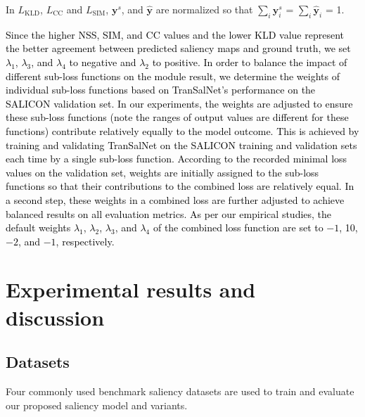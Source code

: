 \documentclass{article}
\begin{document}
In $L_{\text{KLD}}$, $L_{\text{CC}}$ and $L_{\text{SIM}}$, $\textbf{y}^s$, and $\hat{\textbf{y}}$ are normalized so that $\sum_{i} \textbf{y}^s_i$ = $\sum_{i} \hat{\textbf{y}}_i$ = 1.

\textcolor{black}{Since the higher NSS, SIM, and CC values and the lower KLD value represent the better agreement between predicted saliency maps and ground truth, we set ${{\lambda}_1}$, ${{\lambda}_3}$, and ${{\lambda}_4}$ to negative and ${{\lambda}_2}$ to positive. In order to balance the impact of different sub-loss functions on the module result, we determine the weights of individual sub-loss functions based on TranSalNet's performance on the SALICON validation set. In our experiments, the weights are adjusted to ensure these sub-loss functions (note the ranges of output values are different for these functions) contribute relatively equally to the model outcome. This is achieved by training and validating TranSalNet on the SALICON training and validation sets each time by a single sub-loss function. According to the recorded minimal loss values on the validation set, weights are initially assigned to the sub-loss functions so that their contributions to the combined loss are relatively equal. 
In a second step, these weights in a combined loss are further adjusted to achieve balanced results on all evaluation metrics.
As per our empirical studies, the default weights ${{\lambda}_1}$, ${{\lambda}_2}$, ${{\lambda}_3}$, and ${{\lambda}_4}$ of the combined
loss function are set to $-1$, 10, $-2$, and $-1$, respectively.
}


\section{Experimental results and discussion}

\subsection{Datasets}
Four commonly used benchmark saliency datasets are used to train and evaluate our proposed saliency model and variants. 
\end{document}
